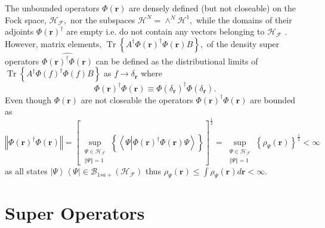 \documentclass[aps,preprint]{revtex4}%
\begin{document}
The unbounded operators $\Phi\left(  \boldsymbol{r}\right)  $ are densely
defined (but not closeable) on the Fock space, $\mathcal{H}_{\mathcal{F}},$
nor the subspaces $\mathcal{H}^{N}=\wedge^{N}\mathcal{H}^{1},$ while the
domains of their adjoints $\Phi\left(  \boldsymbol{r}\right)  ^{\dagger}$ are
empty i.e. do not contain any vectors belonging to $\mathcal{H}_{\mathcal{F}}$
\cite{Thirring}. However, matrix elements, $\operatorname{Tr}\left\{
A^{\dagger}\Phi\left(  \boldsymbol{r}\right)  ^{\dagger}\Phi\left(
\boldsymbol{r}\right)  B\right\}  ,$ of the density super operators
$\widehat{\Phi\left(  \boldsymbol{r}\right)  ^{\dagger}\Phi\left(
\boldsymbol{r}\right)  }$ can be defined as the distributional limits of
$\operatorname{Tr}\left\{  A^{\dagger}\Phi\left(  f\right)  ^{\dagger}%
\Phi\left(  f\right)  B\right\}  $ as $f\rightarrow\delta_{\boldsymbol{r}}$
where
\begin{equation}
\Phi\left(  \boldsymbol{r}\right)  ^{\dagger}\Phi\left(  \boldsymbol{r}%
\right)  \equiv\Phi\left(  \delta_{\boldsymbol{r}}\right)  ^{\dagger}%
\Phi\left(  \delta_{\boldsymbol{r}}\right)  .
\end{equation}
Even though $\Phi\left(  \boldsymbol{r}\right)  $ are not closeable the
operators $\Phi\left(  \boldsymbol{r}\right)  ^{\dagger}\Phi\left(
\boldsymbol{r}\right)  $ are bounded as
\begin{equation}
\left\Vert \Phi\left(  \boldsymbol{r}\right)  ^{\dagger}\Phi\left(
\boldsymbol{r}\right)  \right\Vert =\left[  \sup_{\substack{\Psi\in
\mathcal{H}_{\mathcal{F}}\\\left\Vert \Psi\right\Vert =1}}\left\{
\left\langle \Psi\left\vert \Phi\left(  \boldsymbol{r}\right)  ^{\dagger}%
\Phi\left(  \boldsymbol{r}\right)  \Psi\right.  \right\rangle \right\}
\right]  ^{\frac{1}{2}}=\sup_{\substack{\Psi\in\mathcal{H}_{\mathcal{F}%
}\\\left\Vert \Psi\right\Vert =1}}\left\{  \rho_{\Psi}\left(  \boldsymbol{r}%
\right)  \right\}  ^{\frac{1}{2}}<\infty
\end{equation}
as all states $\left\vert \Psi\right\rangle \left\langle \Psi\right\vert
\in\mathcal{B}_{1sa+}\left(  \mathcal{H}_{\mathcal{F}}\right)  $ thus
$\rho_{\Psi}\left(  \boldsymbol{r}\right)  \leq\int\rho_{\Psi}\left(
\boldsymbol{r}\right)  d\boldsymbol{r}<\infty.$

\section{Super Operators \label{super}}
\end{document}
